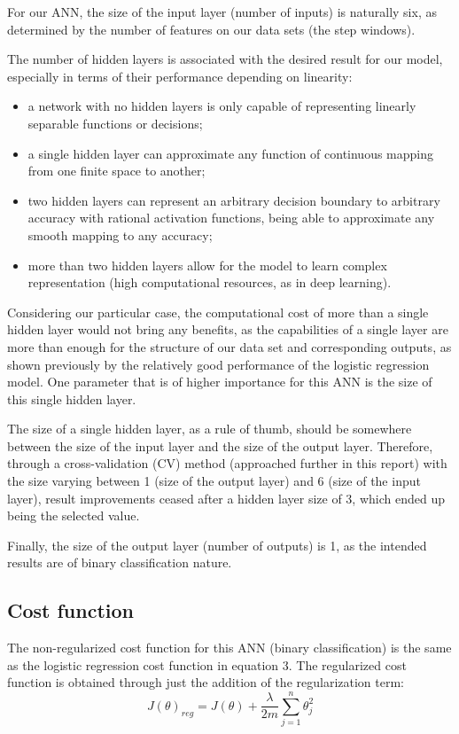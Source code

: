 \documentclass[conference]{IEEEtran}
\begin{document}
For our ANN, the size of the input layer (number of inputs) is naturally six, as determined by the number of features on our data sets (the step windows). 
\par
The number of hidden layers is associated with the desired result for our model, especially in terms of their performance depending on linearity:
\begin{itemize}
    \item a network with no hidden layers is only capable of representing linearly separable functions or decisions;
     \item a single hidden layer can approximate any function of continuous mapping from one finite space to another;
     \item two hidden layers can represent an arbitrary decision boundary to arbitrary accuracy with rational activation functions, being able to approximate any smooth mapping to any accuracy;
     \item more than two hidden layers allow for the model to learn complex representation (high computational resources, as in deep learning).
\end{itemize}
\par Considering our particular case, the computational cost of more than a single hidden layer would not bring any benefits, as the capabilities of a single layer are more than enough for the structure of our data set and corresponding outputs, as shown previously by the relatively good performance of the logistic regression model. One parameter that is of higher importance for this ANN is the size of this single hidden layer.
\par The size of a single hidden layer, as a rule of thumb, should be somewhere between the size of the input layer and the size of the output layer. Therefore, through a cross-validation (CV) method (approached further in this report) with the size varying between 1 (size of the output layer) and 6 (size of the input layer), result improvements ceased after a hidden layer size of 3, which ended up being the selected value.
\par Finally, the size of the output layer (number of outputs) is 1, as the intended results are of binary classification nature.

\subsection{Cost function}
The non-regularized cost function for this ANN (binary classification) is the same as the logistic regression cost function in equation 3. The regularized cost function is obtained through just the addition of the regularization term:
\begin{equation}
    J(\theta)_{reg} = J(\theta)+ \frac{\lambda}{2m}\sum_{j=1}^n \theta_{j}^2
    \label{eq12}
\end{equation}
\end{document}
